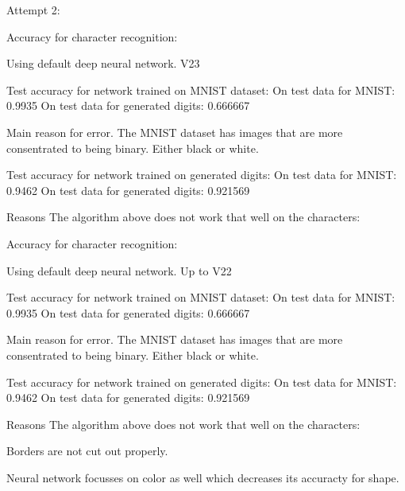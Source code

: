 Attempt 2:

Accuracy for character recognition:

Using default deep neural network. V23

Test accuracy for network trained on MNIST dataset:
On test data for MNIST: 		0.9935
On test data for generated digits: 	0.666667

Main reason for error.
The MNIST dataset has images that are more consentrated to being binary.
Either black or white.

Test accuracy for network trained on generated digits:
On test data for MNIST:			 0.9462
On test data for generated digits:	 0.921569


Reasons The algorithm above does not work that well on the characters:

Accuracy for character recognition:

Using default deep neural network. Up to V22

Test accuracy for network trained on MNIST dataset:
On test data for MNIST: 		0.9935
On test data for generated digits: 	0.666667

Main reason for error.
The MNIST dataset has images that are more consentrated to being binary.
Either black or white.

Test accuracy for network trained on generated digits:
On test data for MNIST:			 0.9462
On test data for generated digits:	 0.921569


Reasons The algorithm above does not work that well on the characters:


Borders are not cut out properly.

Neural network focusses on color as well which decreases its accuracty for shape.
